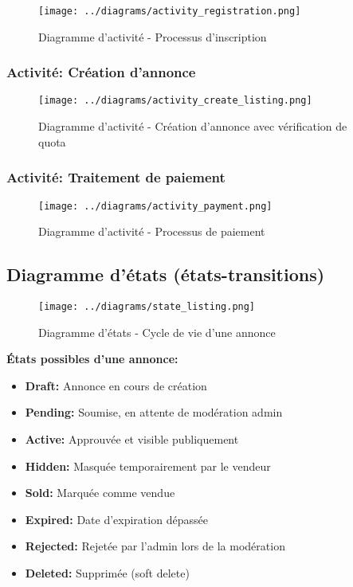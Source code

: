 \begin{figure}[H]
\centering
\texttt{[image: ../diagrams/activity\_registration.png]}
\caption{Diagramme d'activité - Processus d'inscription}
\label{fig:act_registration}
\end{figure}

\subsubsection{Activité: Création d'annonce}

\begin{figure}[H]
\centering
\texttt{[image: ../diagrams/activity\_create\_listing.png]}
\caption{Diagramme d'activité - Création d'annonce avec vérification de quota}
\label{fig:act_listing}
\end{figure}

\subsubsection{Activité: Traitement de paiement}

\begin{figure}[H]
\centering
\texttt{[image: ../diagrams/activity\_payment.png]}
\caption{Diagramme d'activité - Processus de paiement}
\label{fig:act_payment}
\end{figure}

\subsection{Diagramme d'états (états-transitions)}

\begin{figure}[H]
\centering
\texttt{[image: ../diagrams/state\_listing.png]}
\caption{Diagramme d'états - Cycle de vie d'une annonce}
\label{fig:state_listing}
\end{figure}

\textbf{États possibles d'une annonce:}
\begin{itemize}
    \item \textbf{Draft:} Annonce en cours de création
    \item \textbf{Pending:} Soumise, en attente de modération admin
    \item \textbf{Active:} Approuvée et visible publiquement
    \item \textbf{Hidden:} Masquée temporairement par le vendeur
    \item \textbf{Sold:} Marquée comme vendue
    \item \textbf{Expired:} Date d'expiration dépassée
    \item \textbf{Rejected:} Rejetée par l'admin lors de la modération
    \item \textbf{Deleted:} Supprimée (soft delete)
\end{itemize}

